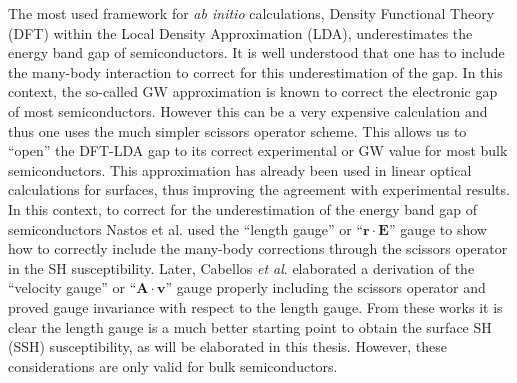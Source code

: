 The most used framework for \textit{ab initio} calculations, Density Functional
Theory (DFT) within the Local Density Approximation (LDA),
\cite{kohnPR65} underestimates the energy band gap of semiconductors. It is well
understood that one has to include the many-body interaction to correct for this
underestimation of the gap. In this context, the so-called GW
approximation\cite{onidaRMP02} is known to correct the electronic gap of most
semiconductors\cite{luceroJPCM12}. However this can be a very expensive
calculation and thus one uses the much simpler scissors operator scheme.
\cite{levinePRL89,levinePRL91,delsolePRB93} This allows us to ``open'' the
DFT-LDA gap to its correct experimental or GW value for most bulk
semiconductors. This approximation has already been used in linear optical
calculations for surfaces,\cite{kippPRL96} thus improving the agreement with
experimental results. In this context, to correct for the underestimation of the
energy band gap of semiconductors Nastos et al.\cite{nastosPRB05} used the
``length gauge'' or ``$\mathbf{r}\cdot\mathbf{E}$'' gauge to show how to
correctly include the many-body corrections through the scissors operator in the
SH susceptibility. Later, Cabellos \textit{et al}.\cite{cabellosPRB09}
elaborated a derivation of the ``velocity gauge'' or
``$\mathbf{A}\cdot\mathbf{v}$'' gauge properly including the scissors operator
and proved gauge invariance with respect to the length gauge. From these works
it is clear the length gauge is a much better starting point to obtain the
surface SH (SSH) susceptibility, as will be elaborated in this thesis. However,
these considerations are only valid for bulk semiconductors.

